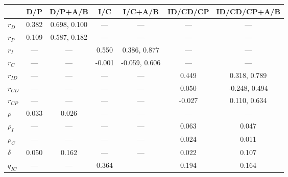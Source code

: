 \begin{supptable}
\begin{center}
    \begin{tabular}{lcccccc}
                       & D/P   & D/P+A/B      & I/C    & I/C+A/B      & ID/CD/CP & ID/CD/CP+A/B \\ \midrule
        $r_D$          & 0.382 & 0.698, 0.100 & ---    & ---          & ---      & ---          \\
        $r_P$          & 0.109 & 0.587, 0.182 & ---    & ---          & ---      & ---          \\
        $r_I$          & ---   & ---          & 0.550  & 0.386, 0.877 & ---      & ---          \\
        $r_C$          & ---   & ---          &-0.001  &-0.059, 0.606 & ---      & ---          \\
        $r_{ID}$       & ---   & ---          & ---    & ---          & 0.449    & 0.318, 0.789 \\
        $r_{CD}$       & ---   & ---          & ---    & ---          & 0.050    &-0.248, 0.494 \\
        $r_{CP}$       & ---   & ---          & ---    & ---          &-0.027    & 0.110, 0.634 \\
        $\rho$         & 0.033 & 0.026        & ---    & ---          & ---      & ---          \\
        $\rho_I$       & ---   & ---          & ---    & ---          & 0.063    & 0.047        \\
        $\rho_C$       & ---   & ---          & ---    & ---          & 0.024    & 0.011        \\
        $\delta$       & 0.050 & 0.162        & ---    & ---          & 0.022    & 0.107        \\
        $q_{IC}$       & ---   & ---          & 0.364  &              & 0.194    & 0.164        
    \end{tabular}


    \end{center}
    \caption{
        Median rate estimates for all fitted models.
        Units are per million years.
        Two comma-separated numbers refer to the $A$ and $B$ hidden states, and --- means the parameter was not present in the model.
    Net diversification rates ($r$) are subscripted with trait state initials (Diploid, Polyploid, Incompatible, Compatible). Transition rates are $\rho$ (polyploidization), subscripted with background breeding system state; $\delta$ (diploidization); and  $q_{IC}$ (loss of self-incompatibility).
    The upper section is for models without diploidization, and the lower section is for models with diploidization.
    The supplemental figures show the corresponding distributions of parameter estimates.
    }
    \label{table:estimates}
\end{supptable}

